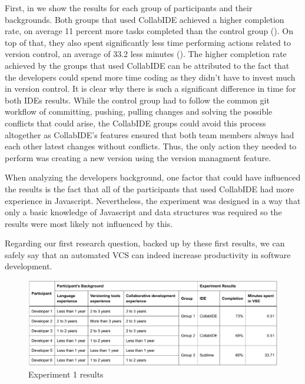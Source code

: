 First, in  we show the results for each group of participants and their backgrounds. Both groups that used CollabIDE achieved a higher completion rate, on average 11 percent more tasks completed than the control group (). On top of that, they also spent significantly less time performing actions related to version control, an average of 33.2 less minutes (). The higher completion rate achieved by the groups that used CollabIDE can be attributed to the fact that the developers could spend more time coding as they didn’t have to invest much in version control. It is clear why there is such a significant difference in time for both IDEs results. While the control group had to follow the common git workflow of committing, pushing, pulling changes and solving the possible conflicts that could arise, the CollabIDE groups could avoid this process altogether as CollabIDE’s features ensured that both team members always had each other latest changes without conflicts. Thus, the only action they needed to perform was creating a new version using the version managment feature.

When analyzing the developers background, one factor that could have influenced the results is the fact that all of the participants that used CollabIDE had more experience in Javascript. Nevertheless, the experiment was designed in a way that only a basic knowledge of Javascript and data structures was required so the results were most likely not influenced by this.

Regarding our first research question, backed up by these first results, we can safely say that an automated \ac{VCS} can indeed increase productivity in software development.

\begin{figure}[htbp]
  \centering
  \includegraphics[width=1\textwidth]{img/resultsTableCollaborative}
  \caption{Experiment 1 results}
  \label{fig:resultsTableCollaborative}
\end{figure}

